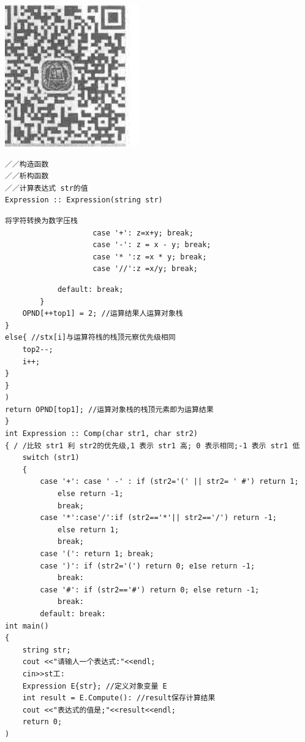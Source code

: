 \documentclass[10pt]{article}
\begin{document}
\begin{center}
\includegraphics[max width=\textwidth]{2025_06_06_704745ea57b15b2333e5g-106}
\end{center}

\begin{verbatim}
／／构造函数
／／析构函数
／／计算表达式 str的值
Expression :: Expression(string str)
\end{verbatim}

\begin{verbatim}
将字符转换为数字压栈
                    case '+': z=x+y; break;
                    case '-': z = x - y; break;
                    case '* ':z =x * y; break;
                    case '//':z =x/y; break;
\end{verbatim}

\begin{verbatim}
            default: break;
        }
    OPND[++top1] = 2; //运算结果人运算对象栈
}
else{ //stx[i]与运算符栈的栈顶元察优先级相同
    top2--;
    i++;
}
}
)
return OPND[top1]; //运算对象栈的栈顶元素即为运算结果
}
int Expression :: Comp(char str1, char str2)
{ / /比较 str1 利 str2的优先级,1 表示 str1 高; 0 表示相同;-1 表示 str1 低
    switch (str1)
    {
        case '+': case ' -' : if (str2='(' || str2= ' #') return 1;
            else return -1;
            break;
        case '*':case'/':if (str2=='*'|| str2=='/') return -1;
            else return 1;
            break;
        case '(': return 1; break;
        case ')': if (str2='(') return 0; e1se return -1;
            break:
        case '#': if (str2=='#') return 0; else return -1;
            break:
        default: break:
int main()
{
    string str;
    cout <<"请输人一个表达式:"<<endl;
    cin>>st工:
    Expression E{str}; //定义对象变量 E
    int result = E.Compute(): //result保存计算结果
    cout <<"表达式的值是;"<<result<<endl;
    return 0;
)
\end{verbatim}
\end{document}
